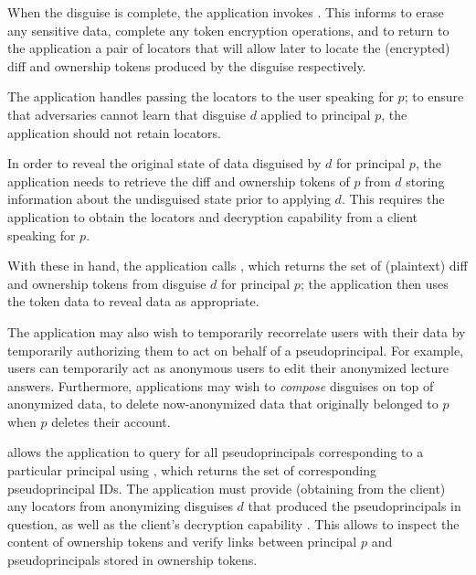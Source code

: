 When the disguise is complete, the application invokes . This informs \sys to erase
any sensitive data, complete any token encryption operations, and to return to the application a
pair of locators that will allow \sys later to locate the (encrypted) diff and ownership tokens
produced by the disguise respectively.

The application handles passing the locators  to the user speaking for $p$; to ensure that
adversaries cannot learn that disguise $d$ applied to principal $p$, the application should not
retain locators.

In order to reveal the original state of data disguised by $d$ for principal $p$, the application 
needs to retrieve the diff and ownership tokens of $p$ from $d$ storing information about the undisguised
state prior to applying $d$.
This requires the application to obtain the locators  and decryption capability 
from a client speaking for $p$.

With these in hand, the application calls , which returns the set of
(plaintext) diff and ownership tokens from disguise $d$ for principal $p$; the application then uses
the token data to reveal data as appropriate.

The application may also wish to temporarily recorrelate users with their data by temporarily
authorizing them to act on behalf of a pseudoprincipal. For example, users can temporarily act as
anonymous users to edit their anonymized lecture answers. Furthermore, applications may wish to
\emph{compose} disguises on top of anonymized data, to \eg delete now-anonymized data that
originally belonged to $p$ when $p$ deletes their account.

\sys allows the application to query for all pseudoprincipals corresponding to a particular
principal using , which returns the set of corresponding pseudoprincipal
IDs. The application must provide (obtaining from the client) any locators  from 
anonymizing disguises $d$ that produced the pseudoprincipals in question, as well as the client's
decryption capability . This allows \sys to inspect the content of ownership tokens and
verify links between principal $p$ and pseudoprincipals stored in ownership tokens.

